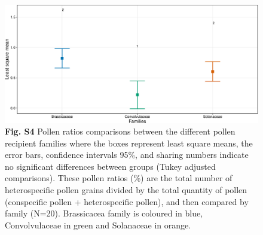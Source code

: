 \documentclass[
  12pt,
]{article}
\begin{document}
\begin{figure}
\centering
\includegraphics{Supp_Material_files/figure-latex/unnamed-chunk-12-1.pdf}
\caption{\textbf{Fig. S4} Pollen ratios comparisons between the
different pollen recipient families where the boxes represent least
square means, the error bars, confidence intervals 95\%, and sharing
numbers indicate no significant differences between groups (Tukey
adjusted comparisons). These pollen ratios (\%) are the total number of
heterospecific pollen grains divided by the total quantity of pollen
(conspecific pollen + heterospecific pollen), and then compared by
family (N=20). Brassicacea family is coloured in blue, Convolvulaceae in
green and Solanaceae in orange.}
\end{figure}

\newpage
\end{document}
